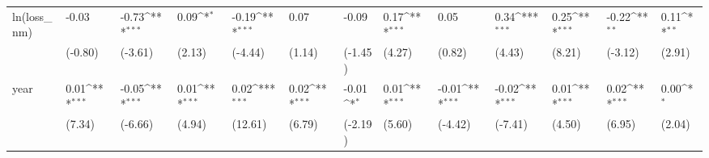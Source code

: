 \def\sym#1{\ifmmode^{#1}\else\(^{#1}\)\fi}
\begin{tabular}{p{1.5cm} p{1.7cm} p{1.7cm} p{1.7cm}  p{1.7cm} p{1.7cm} p{1.7cm} p{1.7cm} p{1.7cm}  p{1.7cm} p{1.7cm} p{1.7cm} p{1.7cm} }
\hline
ln(loss\_nm)     &    -0.03         &    -0.73\sym{***}&     0.09\sym{*}  &    -0.19\sym{***}&     0.07         &    -0.09         &     0.17\sym{***}&     0.05         &     0.34\sym{***}&     0.25\sym{***}&    -0.22\sym{**} &     0.11\sym{**} \\
                &  (-0.80)         &  (-3.61)         &   (2.13)         &  (-4.44)         &   (1.14)         &  (-1.45)         &   (4.27)         &   (0.82)         &   (4.43)         &   (8.21)         &  (-3.12)         &   (2.91)         \\
year            &     0.01\sym{***}&    -0.05\sym{***}&     0.01\sym{***}&     0.02\sym{***}&     0.02\sym{***}&    -0.01\sym{*}  &     0.01\sym{***}&    -0.01\sym{***}&    -0.02\sym{***}&     0.01\sym{***}&     0.02\sym{***}&     0.00\sym{*}  \\
                &   (7.34)         &  (-6.66)         &   (4.94)         &  (12.61)         &   (6.79)         &  (-2.19)         &   (5.60)         &  (-4.42)         &  (-7.41)         &   (4.50)         &   (6.95)         &   (2.04)         \\
\end{tabular}
